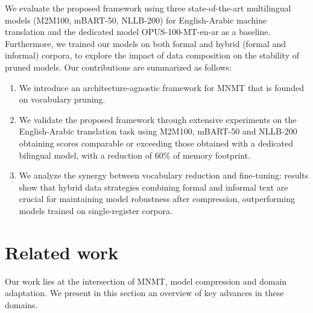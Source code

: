\documentclass{article}
\begin{document}
	We evaluate the proposed framework using three state-of-the-art multilingual models
	(M2M100, mBART-50, NLLB-200) for English-Arabic machine translation and the dedicated
	model OPUS-100-MT-en-ar as a baseline.
	Furthermore, we trained our models on both formal and hybrid (formal and informal) corpora,
	to explore the impact of data composition on the stability of pruned models. Our contributions
	are summarized as follows:
	\begin{enumerate}
		\item We introduce an architecture-agnostic framework for MNMT that is founded on vocabulary
		pruning.
		\item We validate the proposed framework through extensive experiments on the English-Arabic
		translation task using M2M100, mBART-50 and NLLB-200 obtaining scores comparable or exceeding those obtained with a dedicated bilingual model, with a reduction
		of 60\% of memory footprint.
		\item We analyze the synergy between vocabulary reduction and fine-tuning: results show that
		hybrid data strategies combining formal and informal text are crucial for maintaining model
		robustness after compression, outperforming models trained on single-register corpora.
	\end{enumerate}
	
	\section{Related work}
	Our work lies at the intersection of MNMT, model compression and domain adaptation. We
	present in this section an overview of key advances in these domains.
	
\end{document}
